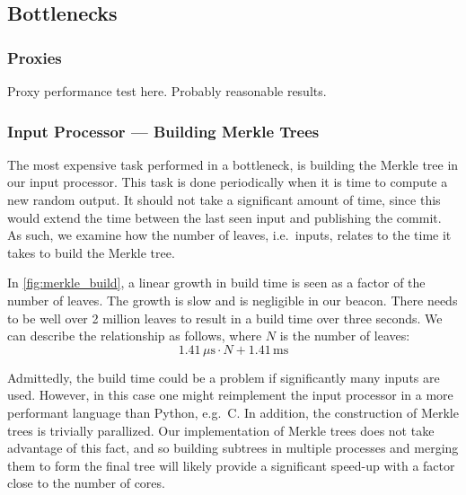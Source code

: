\subsection{Bottlenecks}%
\label{sub:bottlenecks}

\subsubsection{Proxies}%
\label{ssub:proxies}
Proxy performance test here.
Probably reasonable results.


\subsubsection{Input Processor --- Building Merkle Trees}%
\label{ssub:input_processor_building_merkle_trees}
The most expensive task performed in a bottleneck, is building the Merkle tree in our input processor.
This task is done periodically when it is time to compute a new random output.
It should not take a significant amount of time, since this would extend the time between the last seen input and publishing the commit.
As such, we examine how the number of leaves, i.e.\ inputs, relates to the time it takes to build the Merkle tree.

In \cref{fig:merkle_build}, a linear growth in build time is seen as a factor of the number of leaves.
The growth is slow and is negligible in our beacon. There needs to be well over 2 million leaves to result in a build time over three seconds.
We can describe the relationship as follows, where $N$ is the number of leaves:
$$
1.41\,\mu\text{s} \cdot N + 1.41\,\text{ms}
$$

Admittedly, the build time could be a problem if significantly many inputs are used.
However, in this case one might reimplement the input processor in a more performant language than Python, e.g.\ C.
In addition, the construction of Merkle trees is trivially parallized. Our implementation of Merkle trees does not take advantage of this fact, and so building subtrees in multiple processes and merging them to form the final tree will likely provide a significant speed-up with a factor close to the number of cores.

